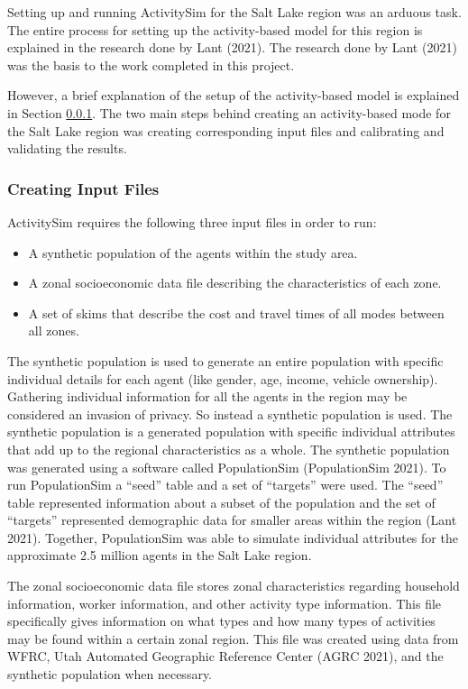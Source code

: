 \documentclass[12pt, oneside, openright]{byuthesis}
\providecommand{\tightlist}{%
  \setlength{\itemsep}{0pt}\setlength{\parskip}{0pt}}
\begin{document}
Setting up and running ActivitySim for the Salt Lake region was an arduous task. The entire process for setting up the activity-based model for this region is explained in the research done by Lant (2021). The research done by Lant (2021) was the basis to the work completed in this project.

However, a brief explanation of the setup of the activity-based model is explained in Section \ref{asiminput}. The two main steps behind creating an activity-based mode for the Salt Lake region was creating corresponding input files and calibrating and validating the results.

\hypertarget{asiminput}{%
\subsubsection{Creating Input Files}\label{asiminput}}

ActivitySim requires the following three input files in order to run:

\begin{itemize}
\tightlist
\item
  A synthetic population of the agents within the study area.
\item
  A zonal socioeconomic data file describing the characteristics of each zone.
\item
  A set of skims that describe the cost and travel times of all modes between all zones.
\end{itemize}

The synthetic population is used to generate an entire population with specific individual details for each agent (like gender, age, income, vehicle ownership). Gathering individual information for all the agents in the region may be considered an invasion of privacy. So instead a synthetic population is used. The synthetic population is a generated population with specific individual attributes that add up to the regional characteristics as a whole. The synthetic population was generated using a software called PopulationSim (PopulationSim 2021). To run PopulationSim a ``seed'' table and a set of ``targets'' were used. The ``seed'' table represented information about a subset of the population and the set of ``targets'' represented demographic data for smaller areas within the region (Lant 2021). Together, PopulationSim was able to simulate individual attributes for the approximate 2.5 million agents in the Salt Lake region.

The zonal socioeconomic data file stores zonal characteristics regarding household information, worker information, and other activity type information. This file specifically gives information on what types and how many types of activities may be found within a certain zonal region. This file was created using data from WFRC, Utah Automated Geographic Reference Center (AGRC 2021), and the synthetic population when necessary.
\end{document}
